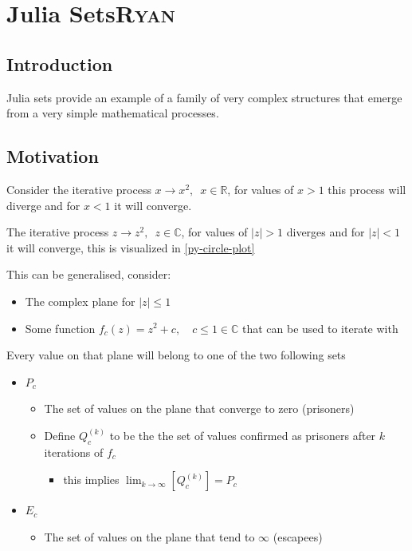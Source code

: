 \documentclass[a4paper,11pt,twoside]{article}
\begin{document}
\section{Julia Sets\hfill{}\textsc{Ryan}}
\label{sec:org136782a}
\subsection{Introduction}
\label{sec:org11bf68f}
Julia sets provide an example of a family of very complex structures that emerge from a very simple mathematical processes.
\subsection{Motivation}
\label{sec:orgac00b28}
Consider the iterative process \(x \rightarrow x^{2}, \enspace x \in \mathbb{R}\),
for values of \(x>1\) this process will diverge and for \(x<1\) it will converge.

The iterative process \(z \rightarrow z^{2}, \enspace z \in \mathbb{C}\),
for values of \(\left\lvert z \right\rvert >1\) diverges and for \(\left\lvert z \right\rvert <1\) it will converge, this is visualized in \ref{py-circle-plot}

This can be generalised, consider:

\begin{itemize}
\item The complex plane for \(\left\lvert z \right\rvert \leq 1\)
\item Some function \(f_{c}(z) = z^{2} + c, \quad c \leq 1 \in \mathbb{C}\) that can be used to iterate with
\end{itemize}

Every value on that plane will belong to one of the two following sets

\begin{itemize}
\item \(P_{c}\)
\begin{itemize}
\item The set of values on the plane that converge to zero (prisoners)
\item Define \(Q^{(k)}_{c}\) to be the the set of values confirmed as prisoners after \(k\) iterations of \(f_{c}\)
\begin{itemize}
\item this implies \(\lim_{k \rightarrow \infty} \left[ Q^{(k)}_{c}  \right] = P_{c}\)
\end{itemize}
\end{itemize}
\item \(E_{c}\)
\begin{itemize}
\item The set of values on the plane that tend to \(\infty\) (escapees)
\end{itemize}
\end{itemize}
\end{document}
